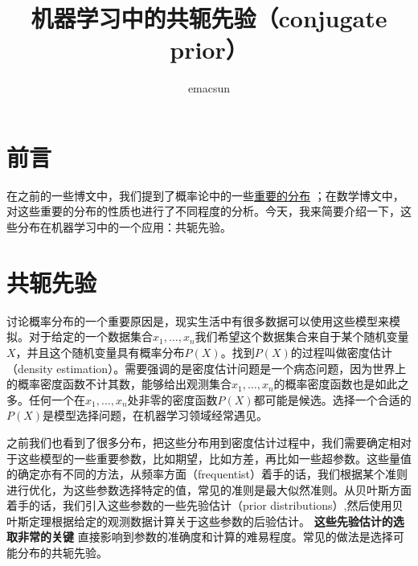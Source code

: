 \documentclass[10pt,a4paper,UTF8]{article}
\author{emacsun}
\date{}
\title{机器学习中的共轭先验（conjugate prior）}
\begin{document}
\maketitle
\tableofcontents
{}

\section{前言}
\label{sec:org5fc7108}


在之前的一些博文中，我们提到了概率论中的一些\href{file:///c:/Users/cliyh/AppData/Roaming/zorg/output/computer/MLAPP/MLAPPch2dot3-some-probability-distributions.org}{重要的分布} ；在数学博文中，对这些重要的分布的性质也进行了不同程度的分析。今天，我来简要介绍一下，这些分布在机器学习中的一个应用：共轭先验。

\section{共轭先验}
\label{sec:orgcdeb788}


讨论概率分布的一个重要原因是，现实生活中有很多数据可以使用这些模型来模拟。对于给定的一个数据集合\(x_{1},\ldots ,x_{n}\)我们希望这个数据集合来自于某个随机变量\(X\)，并且这个随机变量具有概率分布\(P(X)\)。找到\(P(X)\)的过程叫做密度估计（density estimation）。需要强调的是密度估计问题是一个病态问题，因为世界上的概率密度函数不计其数，能够给出观测集合\(x_{1},\ldots ,x_{n}\)的概率密度函数也是如此之多。任何一个在\(x_{1},\ldots ,x_{n}\)处非零的密度函数\(P(X)\)都可能是候选。选择一个合适的\(P(X)\)是模型选择问题，在机器学习领域经常遇见。

之前我们也看到了很多分布，把这些分布用到密度估计过程中，我们需要确定相对于这些模型的一些重要参数，比如期望，比如方差，再比如一些超参数。这些量值的确定亦有不同的方法，从频率方面（frequentist）着手的话，我们根据某个准则进行优化，为这些参数选择特定的值，常见的准则是最大似然准则。从贝叶斯方面着手的话，我们引入这些参数的一些先验估计（prior distributions）,然后使用贝叶斯定理根据给定的观测数据计算关于这些参数的后验估计。 \textbf{这些先验估计的选取非常的关键} 直接影响到参数的准确度和计算的难易程度。常见的做法是选择可能分布的共轭先验。
\end{document}
